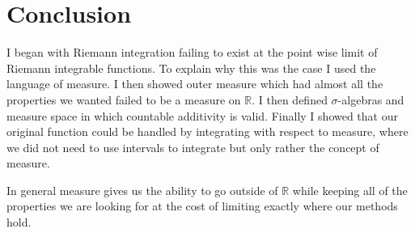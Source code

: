 \documentclass[12pt]{article}
\theoremstyle{plain}
\theoremstyle{definition}
\theoremstyle{definition}
\theoremstyle{remark}
\begin{document}
\section{Conclusion}
I began with Riemann integration failing to exist at the point wise limit
of Riemann integrable functions. To explain why this was the case I used the language
of measure. I then showed outer measure which had almost all the properties we wanted
failed to be a measure on $\mathbb{R}$. I then defined $\sigma$-algebras and measure
space in which countable additivity is valid. Finally I showed that our original function
could be handled by integrating with respect to measure, where we did not
need to use intervals to integrate but only rather the concept of measure. 

In general measure gives us the ability to go outside of $\mathbb{R}$ while keeping
all of the properties we are looking for at the cost of limiting exactly where our
methods hold.
\end{document}

